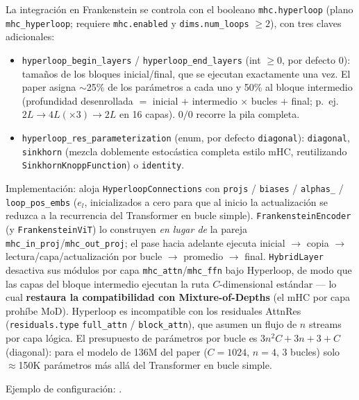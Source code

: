 La integración en Frankenstein se controla con el booleano
\texttt{mhc.hyperloop} (plano \texttt{mhc\_hyperloop}; requiere
\texttt{mhc.enabled} y \texttt{dims.num\_loops} $\ge 2$), con tres claves
adicionales:
\begin{itemize}[leftmargin=*]
    \item \texttt{hyperloop\_begin\_layers} / \texttt{hyperloop\_end\_layers}
        (int $\ge 0$, por defecto $0$): tamaños de los bloques inicial/final,
        que se ejecutan exactamente una vez. El paper asigna $\sim$25\% de
        los parámetros a cada uno y 50\% al bloque intermedio (profundidad
        desenrollada $=$ inicial $+$ intermedio $\times$ bucles $+$ final;
        p.\ ej.\ $2L \to 4L(\times3) \to 2L$ en 16 capas). $0/0$ recorre la
        pila completa.
    \item \texttt{hyperloop\_res\_parameterization} (enum, por defecto
        \texttt{diagonal}): \texttt{diagonal}, \texttt{sinkhorn} (mezcla
        doblemente estocástica completa estilo mHC, reutilizando
        \texttt{Sinkhorn\-Knopp\-Function}) o \texttt{identity}.
\end{itemize}

Implementación:  aloja
\texttt{HyperloopConnections} con \texttt{projs} / \texttt{biases} /
\texttt{alphas\_\*} / \texttt{loop\_pos\_embs} ($e_l$, inicializados a cero
para que al inicio la actualización se reduzca a la recurrencia del
Transformer en bucle simple). \texttt{FrankensteinEncoder} (y
\texttt{FrankensteinViT}) lo construyen \emph{en lugar de} la pareja
\texttt{mhc\_in\_proj}/\texttt{mhc\_out\_proj}; el pase hacia adelante
ejecuta inicial $\to$ copia $\to$ lectura/capa/actualización por bucle
$\to$ promedio $\to$ final. \texttt{HybridLayer} desactiva sus módulos por
capa \texttt{mhc\_attn}/\texttt{mhc\_ffn} bajo Hyperloop, de modo que las
capas del bloque intermedio ejecutan la ruta $C$-dimensional estándar --- lo
cual \textbf{restaura la compatibilidad con Mixture-of-Depths} (el mHC por
capa prohíbe MoD). Hyperloop es incompatible con los residuales AttnRes
(\texttt{residuals.type} \texttt{full\_attn} / \texttt{block\_attn}), que
asumen un flujo de $n$ streams por capa lógica. El presupuesto de parámetros
por bucle es $3n^2C + 3n + 3 + C$ (diagonal): para el modelo de 136M del
paper ($C = 1024$, $n = 4$, 3 bucles) solo $\approx$150K parámetros más allá
del Transformer en bucle simple.

Ejemplo de configuración: .

